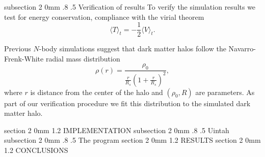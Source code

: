 \documentclass[notitlepage, 12pt]{article}
\makeatletter
\renewcommand{\section}{\@startsection       %
        {section}
        {2}
        {0mm}
        {1.2\baselineskip}
        {\baselineskip}
        {\centering\normalsize}}
\renewcommand{\subsection}{\@startsection    %
        {subsection}
        {2}
        {0mm}
        {.8\baselineskip}
        {.5\baselineskip}
        {\bfseries\normalsize}}
\makeatother
\begin{document}
\subsection{Verification of results}
To verify the simulation results we test for energy conservation, compliance with the virial theorem 
\begin{equation}
\langle T \rangle_t = -\frac{1}{2}\langle V \rangle_t.
\end{equation}

Previous $N$-body simulations suggest that dark matter halos follow the Navarro-Frenk-White radial mass distribution 
\begin{equation}
\rho(r) = \frac{\rho_0}{\frac{r}{R_s}\left(1 + \frac{r}{R_s}\right)^2},
\end{equation}
where $r$ is distance from the center of the halo and $(\rho_0,R)$ are parameters. As part of our verification procedure we fit this distribution to the simulated dark matter halo.

\section{IMPLEMENTATION}
\subsection{Uintah}
\subsection{The program}
\section{RESULTS}
\section{CONCLUSIONS}

%
\end{document}
